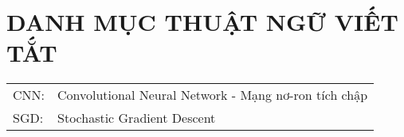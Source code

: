 \chapter*{DANH MỤC THUẬT NGỮ VIẾT TẮT}

\begin{tabular}{ l l }
	CNN: & Convolutional Neural Network - Mạng nơ-ron tích chập\\
	SGD: & Stochastic Gradient Descent
\end{tabular}